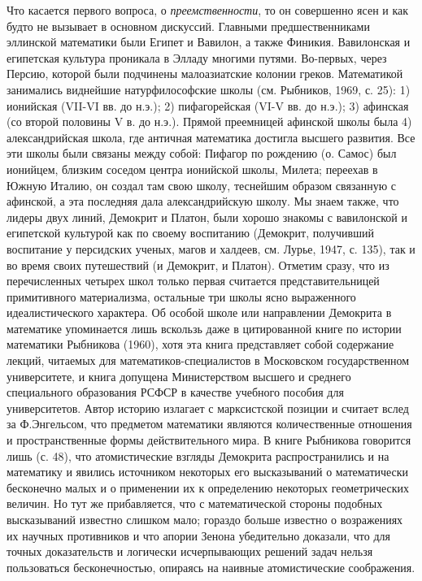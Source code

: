 Что  касается   первого  вопроса,  о  \emph{преемственности},   то  он
совершенно ясен и как будто не вызывает в основном дискуссий. Главными
предшественниками эллинской математики были  Египет и Вавилон, а также
Финикия. Вавилонская и египетская  культура проникала в Элладу многими
путями. Во-первых, через Персию,  которой были подчинены малоазиатские
колонии  греков.  Математикой  занимались  виднейшие  натурфилософские
школы (см. Рыбников, 1969, с. 25):  1) ионийская (VII-VI вв. до н.э.);
2) пифагорейская (VI-V вв. до н.э.); 3) афинская (со второй половины V
в. до н.э.). Прямой преемницей  афинской школы была 4) александрийская
школа,  где античная  математика  достигла высшего  развития. Все  эти
школы были  связаны между  собой: Пифагор по  рождению (о.  Самос) был
ионийцем, близким  соседом центра ионийской школы,  Милета; переехав в
Южную Италию, он создал там  свою школу, теснейшим образом связанную с
афинской, а эта последняя дала  александрийскую школу. Мы знаем также,
что  лидеры  двух  линий,  Демокрит  и  Платон,  были  хорошо  знакомы
с  вавилонской  и  египетской   культурой  как  по  своему  воспитанию
(Демокрит, получивший воспитание у персидских ученых, магов и халдеев,
см.  Лурье,  1947, с.  135),  так  и  во  время своих  путешествий  (и
Демокрит, и Платон). Отметим сразу,  что из перечисленных четырех школ
только первая считается  представительницей примитивного материализма,
остальные три  школы ясно  выраженного идеалистического  характера. Об
особой  школе  или  направлении  Демокрита  в  математике  упоминается
лишь  вскользь  даже  в   цитированной  книге  по  истории  математики
Рыбникова (1960), хотя эта книга представляет собой содержание лекций,
читаемых  для  математиков-специалистов в  Московском  государственном
университете,  и  книга  допущена  Министерством  высшего  и  среднего
специального  образования  РСФСР  в   качестве  учебного  пособия  для
университетов. Автор историю излагает с марксистской позиции и считает
вслед за Ф.Энгельсом, что предметом математики являются количественные
отношения  и  пространственные  формы действительного  мира.  В  книге
Рыбникова говорится лишь (с. 48), что атомистические взгляды Демокрита
распространились и  на математику  и явились источником  некоторых его
высказываний  о математически  бесконечно малых  и о  применении их  к
определению некоторых геометрических величин.  Но тут же прибавляется,
что с  математической стороны  подобных высказываний  известно слишком
мало; гораздо больше  известно о возражениях их  научных противников и
что апории  Зенона убедительно доказали, что  для точных доказательств
и   логически   исчерпывающих   решений  задач   нельзя   пользоваться
бесконечностью, опираясь на наивные атомистические соображения.

